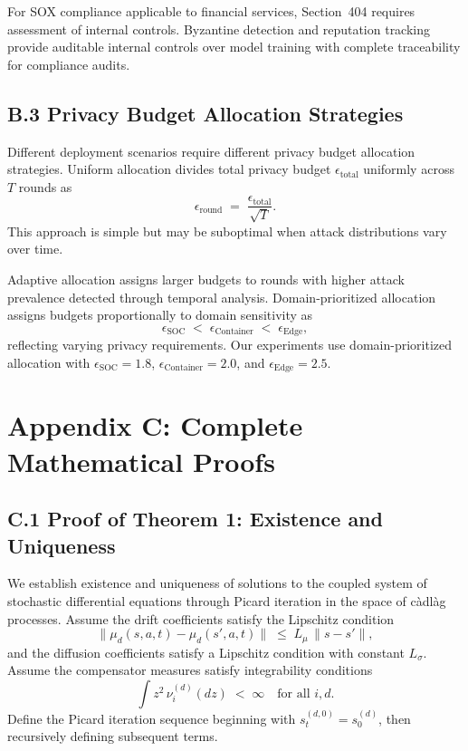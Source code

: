 \documentclass[12pt,a4paper]{article}
\theoremstyle{definition}
\begin{document}
For SOX compliance applicable to financial services, Section~404 requires assessment of internal controls. Byzantine detection and reputation tracking provide auditable internal controls over model training with complete traceability for compliance audits.

\endgroup

\subsection{B.3 Privacy Budget Allocation Strategies}

\begingroup
\setlength{\emergencystretch}{2em}

Different deployment scenarios require different privacy budget allocation strategies. Uniform allocation divides total privacy budget \(\epsilon_{\text{total}}\) uniformly across \(T\) rounds as
\[
\epsilon_{\text{round}} \;=\; \frac{\epsilon_{\text{total}}}{\sqrt{T}}.
\]
This approach is simple but may be suboptimal when attack distributions vary over time.

Adaptive allocation assigns larger budgets to rounds with higher attack prevalence detected through temporal analysis. Domain-prioritized allocation assigns budgets proportionally to domain sensitivity as
\[
\epsilon_{\text{SOC}} \;<\; \epsilon_{\text{Container}} \;<\; \epsilon_{\text{Edge}},
\]
reflecting varying privacy requirements. Our experiments use domain-prioritized allocation with
\(\epsilon_{\text{SOC}}=1.8\), \(\epsilon_{\text{Container}}=2.0\), and \(\epsilon_{\text{Edge}}=2.5\).

\endgroup

\section{Appendix C: Complete Mathematical Proofs}

\subsection{C.1 Proof of Theorem 1: Existence and Uniqueness}

\begingroup
\setlength{\emergencystretch}{2em}

We establish existence and uniqueness of solutions to the coupled system of stochastic differential equations through Picard iteration in the space of càdlàg processes. Assume the drift coefficients satisfy the Lipschitz condition
\[
\big\|\mu_d(s,a,t)-\mu_d(s',a,t)\big\| \;\le\; L_{\mu}\,\|s-s'\|,
\]
and the diffusion coefficients satisfy a Lipschitz condition with constant \(L_{\sigma}\). Assume the compensator measures satisfy integrability conditions
\[
\int z^{2}\,\nu_{i}^{(d)}(dz)\;<\;\infty \quad \text{for all } i,d.
\]
Define the Picard iteration sequence beginning with \(s_{t}^{(d,0)}=s_{0}^{(d)}\), then recursively defining subsequent terms.
\end{document}
